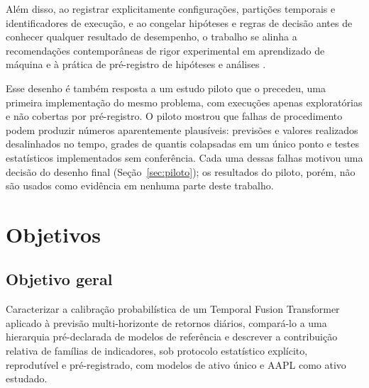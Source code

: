 Além disso, ao registrar explicitamente configurações, partições temporais e identificadores de execução, e ao congelar hipóteses e regras de decisão antes de conhecer qualquer resultado de desempenho, o trabalho se alinha a recomendações contemporâneas de rigor experimental em aprendizado de máquina \cite{PINEAU2021REPRODUCIBILITY} e à prática de pré-registro de hipóteses e análises \cite{NOSEK2018}.

Esse desenho é também resposta a um estudo piloto que o precedeu, uma primeira implementação do mesmo problema, com execuções apenas exploratórias e não cobertas por pré-registro. O piloto mostrou que falhas de procedimento podem produzir números aparentemente plausíveis: previsões e valores realizados desalinhados no tempo, grades de quantis colapsadas em um único ponto e testes estatísticos implementados sem conferência. Cada uma dessas falhas motivou uma decisão do desenho final (Seção~\ref{sec:piloto}); os resultados do piloto, porém, não são usados como evidência em nenhuma parte deste trabalho.

\section{Objetivos}
\subsection{Objetivo geral}
Caracterizar a calibração probabilística de um Temporal Fusion Transformer aplicado à previsão multi-horizonte de retornos diários, compará-lo a uma hierarquia pré-declarada de modelos de referência e descrever a contribuição relativa de famílias de indicadores, sob protocolo estatístico explícito, reprodutível e pré-registrado, com modelos de ativo único e AAPL como ativo estudado.

